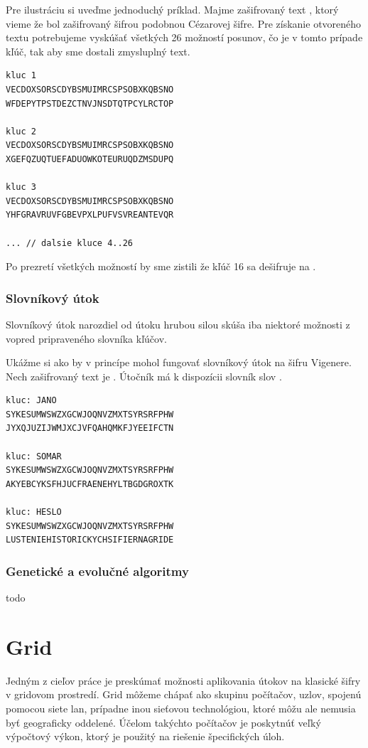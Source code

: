 Pre ilustráciu si uveďme jednoduchý príklad. Majme zašifrovaný text , ktorý vieme že bol zašifrovaný šifrou podobnou Cézarovej šifre.
Pre získanie otvoreného textu potrebujeme vyskúšať všetkých 26 možností posunov, čo je v tomto prípade kľúč, tak aby sme dostali zmysluplný text.

\begin{lstlisting}
kluc 1
VECDOXSORSCDYBSMUIMRCSPSOBXKQBSNO
WFDEPYTPSTDEZCTNVJNSDTQTPCYLRCTOP

kluc 2
VECDOXSORSCDYBSMUIMRCSPSOBXKQBSNO
XGEFQZUQTUEFADUOWKOTEURUQDZMSDUPQ

kluc 3
VECDOXSORSCDYBSMUIMRCSPSOBXKQBSNO
YHFGRAVRUVFGBEVPXLPUFVSVREANTEVQR

... // dalsie kluce 4..26
\end{lstlisting}

Po prezretí všetkých možností by sme zistili že kľúč 16 sa dešifruje na .


\subsubsection{Slovníkový útok}
Slovníkový útok narozdiel od útoku hrubou silou skúša iba niektoré možnosti z vopred pripraveného slovníka kľúčov.

Ukážme si ako by v princípe mohol fungovať slovníkový útok na šifru Vigenere.
Nech zašifrovaný text je . Útočník má k dispozícii slovník slov .

\begin{lstlisting}
kluc: JANO
SYKESUMWSWZXGCWJOQNVZMXTSYRSRFPHW
JYXQJUZIJWMJXCJVFQAHQMKFJYEEIFCTN

kluc: SOMAR
SYKESUMWSWZXGCWJOQNVZMXTSYRSRFPHW
AKYEBCYKSFHJUCFRAENEHYLTBGDGROXTK

kluc: HESLO
SYKESUMWSWZXGCWJOQNVZMXTSYRSRFPHW
LUSTENIEHISTORICKYCHSIFIERNAGRIDE
\end{lstlisting}

\subsubsection{Genetické a evolučné algoritmy}
todo

\section{Grid}
Jedným z cieľov práce je preskúmať možnosti aplikovania útokov na klasické šifry v gridovom prostredí.
Grid môžeme chápať ako skupinu počítačov, uzlov, spojenú pomocou siete \acrfull{lan}, prípadne inou sieťovou technológiou,
ktoré môžu ale nemusia byť geograficky oddelené.
Účelom takýchto počítačov je poskytnúť veľký výpočtový výkon, ktorý je použitý na riešenie špecifických úloh.

